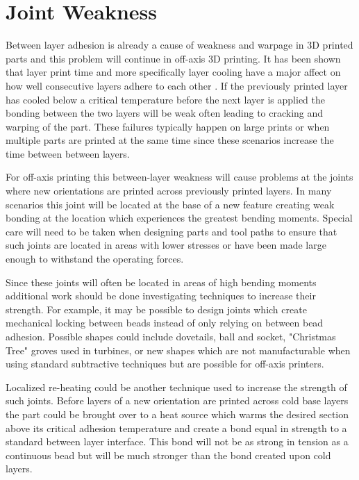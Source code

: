\documentclass[main.tex]{subfiles}
\begin{document}
\section{Joint Weakness}
Between layer adhesion is already a cause of weakness and warpage in 3D printed parts and this problem will continue in off-axis 3D printing.
It has been shown that layer print time and more specifically layer cooling have a major affect on how well consecutive layers adhere to each other \cite{Sun2015}.
If the previously printed layer has cooled below a critical temperature before the next layer is applied the bonding between the two layers will be weak often leading to cracking and warping of the part.
These failures typically happen on large prints or when multiple parts are printed at the same time since these scenarios increase the time between between layers.

For off-axis printing this between-layer weakness will cause problems at the joints where new orientations are printed across previously printed layers.
In many scenarios this joint will be located at the base of a new feature creating weak bonding at the location which experiences the greatest bending moments.
Special care will need to be taken when designing parts and tool paths to ensure that such joints are located in areas with lower stresses or have been made large enough to withstand the operating forces.

Since these joints will often be located in areas of high bending moments additional work should be done investigating techniques to increase their strength.
For example, it may be possible to design joints which create mechanical locking between beads instead of only relying on between bead adhesion.
Possible shapes could include dovetails, ball and socket, "Christmas Tree" groves used in turbines, or new shapes which are not manufacturable when using standard subtractive techniques but are possible for off-axis printers.

Localized re-heating could be another technique used to increase the strength of such joints.
Before layers of a new orientation are printed across cold base layers the part could be brought over to a heat source which warms the desired section above its critical adhesion temperature and create a bond equal in strength to a standard between layer interface.
This bond will not be as strong in tension as a continuous bead but will be much stronger than the bond created upon cold layers.
\end{document}

